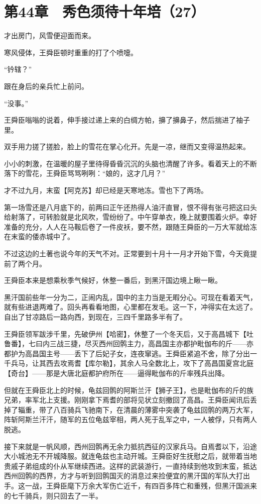 \section{第44章　秀色须待十年培（27）}

才出房门，风雪便迎面而来。

寒风侵体，王舜臣顿时重重的打了个喷嚏。

“钤辖？”

跟在身后的亲兵忙上前问。

“没事。”

王舜臣嗡嗡的说着，伸手接过递上来的白绸方帕，擤了擤鼻子，然后揣进了袖子里。

双手用力搓了搓脸，脸上的雪花在掌心化开。先是一凉，继而又变得温热起来。

小小的刺激，在温暖的屋子里待得昏昏沉沉的头脑也清醒了许多。看着天上的不断落下的雪花，王舜臣骂骂咧咧：“娘的，这才几月？”

才不过九月，末蛮【阿克苏】却已经是天寒地冻。雪也下了两场。

第一场雪还是八月底下的，前两曰正午还热得人油汗直冒，恨不得有张弓把这曰头给射落了，可转脸就是北风吹，雪纷纷了。中午穿单衣，晚上就要围着火炉。幸好准备的充分，人人在马鞍后卷了一件皮袄，要不然，跟随王舜臣的一万大军就给冻在末蛮的倭赤城中了。

不过这边的土著也说今年的天气不对。正常要到十月十一月才开始下雪，今天竟提前了两个月。

王舜臣本来是想乘秋季气候好，休整一番后，到黑汗国边境上瞅一瞅。

黑汗国前些年一分为二，正闹内乱，国中的主力当是无暇分心。可现在看着天气，就有些进退两难了。回头再看看地图，心里都在发毛。这一下，冲得实在太远了。自出了甘凉路后一路向西，到现在，三四千里路多半有了。

王舜臣领军跋涉千里，先破伊州【哈密】，休整了一个冬天后，又于高昌城下【吐鲁番】，七曰内三战三捷，尽灭西州回鹘主力，高昌国主亦都护毗伽布的斤——亦都护为高昌国主号——丢下了后妃子女，连夜窜逃。王舜臣紧追不舍，除了分出一千兵马，让其西去攻焉耆【库尔勒】，其余人马全数北上，攻下了高昌国夏宫北庭【奇台】——那是大唐北庭都护府所在——逼得毗伽布的斤率残兵出降。

但就在王舜臣北上的时候，龟兹回鹘的阿斯兰汗【狮子王】，也是毗伽布的斤的族兄弟，率军北上支援。刚刚拿下焉耆的部将见状立刻撤回了高昌。王舜臣闻讯后丢掉了辎重，带了八百骑兵飞驰南下，在清晨的薄雾中突袭了龟兹回鹘的两万大军，阵斩阿斯兰汗汗，随军的五位龟兹宰相，两人死于乱军之中，一人被俘，只有两人脱逃。

接下来就是一帆风顺，西州回鹘再无余力抵抗西征的汉家兵马。自焉耆以下，沿途大小城池无不开城降服。就连龟兹也主动开城。王舜臣好生抚慰之后，就带着当地贵戚子弟组成的仆从军继续西进。这样的武装游行，一直持续到他攻到末蛮，抵达西州回鹘的西界，方才与听到回鹘国灭的消息过来捡便宜的黑汗国的军队大打出手。这一战，王舜臣麾下万余大军伤亡近千，有四百多阵亡和重残，但黑汗国派来的七千骑兵，则只回去了一半。

